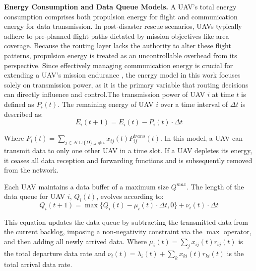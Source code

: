 \documentclass[runningheads]{llncs}
\begin{document}
\textbf{Energy Consumption and Data Queue Models.} A UAV's total energy consumption comprises both propulsion energy for flight and communication energy for data transmission. In post-disaster rescue scenarios, UAVs typically adhere to pre-planned flight paths dictated by mission objectives like area coverage. Because the routing layer lacks the authority to alter these flight patterns, propulsion energy is treated as an uncontrollable overhead from its perspective. Since effectively managing communication energy is crucial for extending a UAV's mission endurance \cite{DRLFR}, the energy model in this work focuses solely on transmission power, as it is the primary variable that routing decisions can directly influence and control.The transmission power of UAV $i$ at time $t$ is defined as $P_i(t)$. The remaining energy of UAV $i$ over a time interval of $\Delta t$ is described as:
\begin{equation}
    E_{i}(t+1)=E_{i}(t)-P_{i}(t)\cdot\Delta t
\end{equation}

Where $P_i(t)=\sum_{j\in \mathcal{N}\cup \{D\},j\neq i}x_{ij}(t)P_{ij}^{trans}(t)$. In this model, a UAV can transmit data to only one other UAV in a time slot. If a UAV depletes its energy, it ceases all data reception and forwarding functions and is subsequently removed from the network.

Each UAV maintains a data buffer of a maximum size $Q^{max}$. The length of the data queue for UAV $i$, $Q_i(t)$, evolves according to:
\begin{equation}
    Q_{i}(t+1)=\max\{Q_{i}(t)-\mu_{i}(t)\cdot\Delta t,0\}+\nu_{i}(t)\cdot\Delta t
\end{equation}

This equation updates the data queue by subtracting the transmitted data from the current backlog, imposing a non-negativity constraint via the $\max$ operator, and then adding all newly arrived data. Where $\mu_{i}(t)=\sum_{j}x_{ij}(t)r_{ij}(t)$ is the total departure data rate and $\nu_{i}(t)=\lambda_{i}(t)+\sum_{k}x_{ki}(t)r_{ki}(t)$ is the total arrival data rate.
\end{document}
